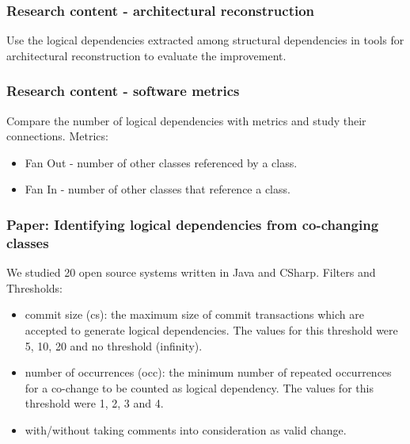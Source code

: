 \documentclass{beamer}
\begin{document}
 \begin{frame}
\frametitle{Research content - architectural reconstruction}
Use the logical dependencies extracted among structural dependencies in tools for architectural reconstruction to evaluate the improvement.

\end{frame}

 \begin{frame}
\frametitle{Research content - software metrics}
Compare the number of logical dependencies with metrics and study their connections. Metrics:
\begin{itemize}
	\item  Fan Out - number of other classes referenced by a class.
	\item  Fan In - number of other classes that reference a class.
\end{itemize}

\end{frame}


 \begin{frame}
\frametitle{Paper: Identifying logical dependencies from co-changing classes}
We studied 20 open source systems written in Java and CSharp.
Filters and Thresholds:
\begin{itemize}
	\item commit size (cs): the maximum size of commit transactions
which are accepted to generate logical dependencies. The
values for this threshold were 5, 10, 20 and no threshold (infinity).
	\item  number of occurrences (occ): the minimum number of
repeated occurrences for a co-change to be counted as logical
dependency. The values for this threshold were 1, 2, 3 and 4.
	\item with/without taking comments into consideration as valid
change.
\end{itemize}

\end{frame}

\end{document}

